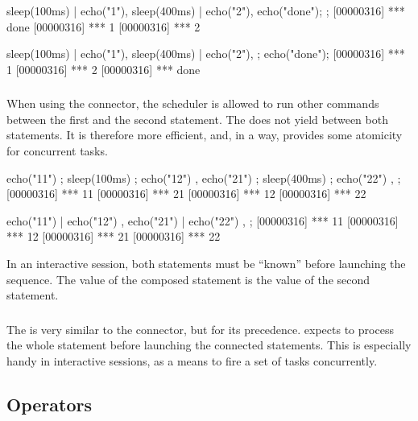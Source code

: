 \begin{urbiscript}
{
  sleep(100ms) | echo("1"),
  sleep(400ms) | echo("2"),
  echo("done");
};
[00000316] *** done
[00000316] *** 1
[00000316] *** 2
\end{urbiscript}

\begin{urbiscript}
{
  sleep(100ms) | echo("1"),
  sleep(400ms) | echo("2"),
};
echo("done");
[00000316] *** 1
[00000316] *** 2
[00000316] *** done
\end{urbiscript}


\subsubsection{\samp{|}}
When using the \samp{;} connector, the scheduler is allowed to run
other commands between the first and the second statement.  The
\samp{|} does not yield between both statements.  It is therefore more
efficient, and, in a way, provides some atomicity for concurrent tasks.

\begin{urbiscript}
{
  { echo("11") ; sleep(100ms) ; echo("12") },
  { echo("21") ; sleep(400ms) ; echo("22") },
};
[00000316] *** 11
[00000316] *** 21
[00000316] *** 12
[00000316] *** 22
\end{urbiscript}

\begin{urbiscript}
{
  { echo("11") | echo("12") },
  { echo("21") | echo("22") },
};
[00000316] *** 11
[00000316] *** 12
[00000316] *** 21
[00000316] *** 22
\end{urbiscript}

In an interactive session, both statements must be ``known'' before
launching the sequence.  The value of the composed statement is the value of
the second statement.

\subsubsection{\samp{\&}}

The \samp{\&} is very similar to the \samp{,} connector, but for its
precedence.  \urbi expects to process the whole statement before launching
the connected statements.  This is especially handy in interactive sessions,
as a means to fire a set of tasks concurrently.


\subsection{Operators}

